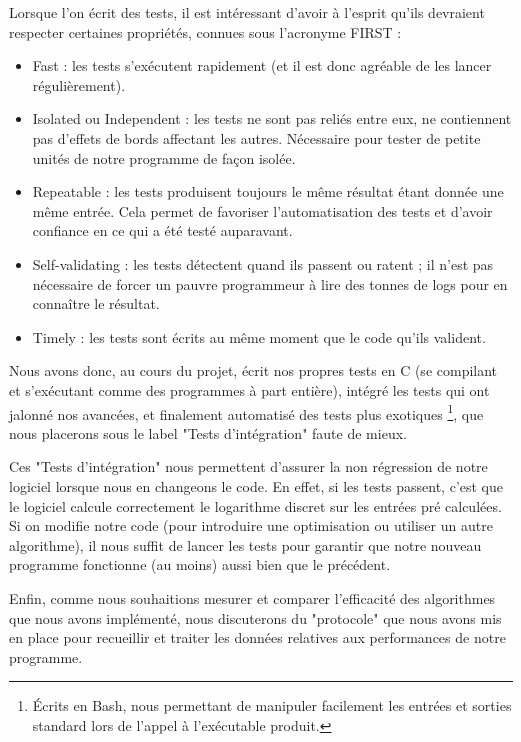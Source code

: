       Lorsque l'on écrit des tests, il est intéressant d'avoir à l'esprit qu'ils devraient respecter certaines propriétés, connues sous l'acronyme FIRST :
      \begin{itemize}
        \item Fast : les tests s'exécutent rapidement (et il est donc agréable de les lancer régulièrement).
        \item Isolated ou Independent : les tests ne sont pas reliés entre eux, ne contiennent pas d'effets de bords affectant les autres. Nécessaire pour tester de petite unités de notre programme de façon isolée.
        \item Repeatable : les tests produisent toujours le même résultat étant donnée une même entrée. Cela permet de favoriser l'automatisation des tests et d'avoir confiance en ce qui a été testé auparavant.
        \item Self-validating : les tests détectent quand ils passent ou ratent ; il n'est pas nécessaire de forcer un pauvre programmeur à lire des tonnes de logs pour en connaître le résultat.
        \item Timely : les tests sont écrits au même moment que le code qu'ils valident.
      \end{itemize}

      Nous avons donc, au cours du projet, écrit nos propres tests en C (se compilant et s'exécutant comme des programmes à part entière), intégré les tests qui ont jalonné nos avancées, et finalement automatisé des tests plus exotiques \footnote{Écrits en Bash, nous permettant de manipuler facilement les entrées et sorties standard lors de l'appel à l'exécutable produit.}, que nous placerons sous le label "Tests d'intégration" faute de mieux.

      Ces "Tests d'intégration" nous permettent d'assurer la non régression de notre logiciel lorsque nous en changeons le code. En effet, si les tests passent, c'est que le logiciel calcule correctement le logarithme discret sur les entrées pré calculées. Si on modifie notre code (pour introduire une optimisation ou utiliser un autre algorithme), il nous suffit de lancer les tests pour garantir que notre nouveau programme fonctionne (au moins) aussi bien que le précédent.

      Enfin, comme nous souhaitions mesurer et comparer l'efficacité des algorithmes que nous avons implémenté, nous discuterons du "protocole" que nous avons mis en place pour recueillir et traiter les données relatives aux performances de notre programme.


